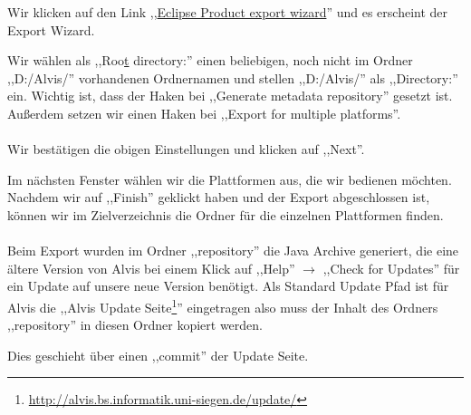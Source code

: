 \documentclass[10pt,a4paper,oneside]{scrbook}
\begin{document}
\begin{center}
\end{center}

Wir klicken auf den  Link ,,\underline{Eclipse Product export wizard}'' und es erscheint der Export Wizard.

\begin{center}
\end{center}

Wir wählen als ,,Roo\underline{t} directory:'' einen beliebigen, noch nicht im Ordner ,,D:/Alvis/'' vorhandenen Ordnernamen und stellen ,,D:/Alvis/'' als ,,Directory:'' ein. 
Wichtig ist, dass der Haken bei ,,Generate metadata repository'' gesetzt ist.
Außerdem setzen wir einen Haken bei ,,Export for multiple platforms''.\\ \\
Wir bestätigen die obigen Einstellungen und klicken auf ,,Next''.
\begin{center}
\end{center}
Im nächsten Fenster wählen wir die Plattformen aus, die wir bedienen möchten.
Nachdem wir auf ,,Finish'' geklickt haben und der Export abgeschlossen ist, können wir im Zielverzeichnis die Ordner für die einzelnen Plattformen finden.
\\ \\
Beim Export wurden im Ordner ,,repository'' die Java Archive generiert, die eine ältere Version von Alvis bei einem Klick auf ,,Help'' \(\rightarrow \) ,,Check for Updates'' für ein Update auf unsere neue Version benötigt. Als Standard Update Pfad ist für Alvis die ,,Alvis Update Seite\footnote{\url{http://alvis.bs.informatik.uni-siegen.de/update/}}'' eingetragen also muss der Inhalt des Ordners ,,repository'' in diesen Ordner kopiert werden.

Dies geschieht über einen ,,commit'' der Update Seite.
\end{document}
